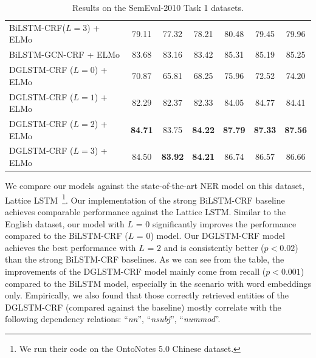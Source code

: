 \begin{table}[h!]
{\begin{tabular}{lcccccc}
			BiLSTM-CRF($L=3$) + {\footnotesize ELMo}  & 79.11 & 77.32 & 78.21 & 80.48 & 79.45 & 79.96\\
			BiLSTM-GCN-CRF  + {\footnotesize ELMo}    &83.68 & 83.16 & 83.42 & 85.31 & 85.19 & 85.25\\
			\cdashlinelr{1-7}
			DGLSTM-CRF ($L=0$) + {\footnotesize ELMo}   & 70.87 & 65.81 & 68.25 &  75.96& 72.52 & 74.20\\
			DGLSTM-CRF ($L=1$) + {\footnotesize ELMo}    & 82.29 & 82.37 & 82.33 & 84.05 & 84.77 & 84.41\\
			DGLSTM-CRF ($L=2$) + {\footnotesize ELMo}    & \textbf{84.71} & 83.75 & \textbf{84.22}& \textbf{87.79} & \textbf{87.33} & \textbf{87.56} \\
			DGLSTM-CRF ($L=3$)  + {\footnotesize ELMo}& 84.50 & \textbf{83.92} & \textbf{84.21} & 86.74 & 86.57 & 86.66 \\
			\bottomrule
		\end{tabular}
	}
	\caption{Results on the SemEval-2010 Task 1 datasets.}
	\label{tab:semevalresult}
\end{table}
We compare our models against the state-of-the-art NER model on this dataset, Lattice LSTM~\cite{zhang2018chinese}\footnote{We run their code on the OntoNotes 5.0 Chinese dataset.}. 
Our implementation of the strong BiLSTM-CRF baseline achieves comparable performance against the Lattice LSTM. 
Similar to the English dataset, our model with $L$ = $0$ significantly improves the performance compared to the BiLSTM-CRF ($L$ = $0$) model. 
Our DGLSTM-CRF model achieves the best performance with $L$ = $2$ and is consistently better ($p<0.02$) than the strong BiLSTM-CRF baselines. 
As we can see from the table, the improvements of the DGLSTM-CRF model mainly come from recall ($p<0.001$) compared to the BiLSTM model, especially in the scenario with word embeddings only. 
Empirically, we also found that those correctly retrieved entities of the DGLSTM-CRF (compared against the baseline) mostly correlate with the following dependency relations: ``\textit{nn}'', ``\textit{nsubj}'', ``\textit{nummod}''.
